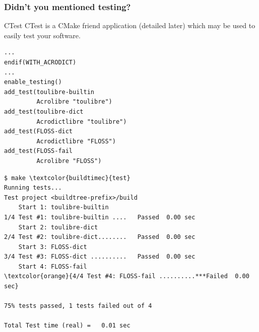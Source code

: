 \documentclass[compress,slidestop,table
              ]
               {beamer}
\begin{document}
\begin{frame}
\frametitle{Didn't you mentioned testing?}
\vspace*{-0.4cm}
\begin{block}{CTest}
CTest is a CMake friend application (detailed later) which may be used to
easily test your software.
\end{block}
\vspace*{-0.7cm}
\begin{multicols}{2}
\begin{lstlisting}[escapechar={§},basicstyle=\tiny,caption=add CTest support]
...
endif(WITH_ACRODICT)
...
enable_testing()
add_test(toulibre-builtin
         Acrolibre "toulibre")
add_test(toulibre-dict
         Acrodictlibre "toulibre")
add_test(FLOSS-dict
         Acrodictlibre "FLOSS")
add_test(FLOSS-fail
         Acrolibre "FLOSS")
\end{lstlisting}
\columnbreak
\begin{Verbatim}[commandchars=\\\{\},fontsize=\tiny]
$ make \textcolor{buildtimec}{test}
Running tests...
Test project <buildtree-prefix>/build
    Start 1: toulibre-builtin
1/4 Test #1: toulibre-builtin ....   Passed  0.00 sec
    Start 2: toulibre-dict
2/4 Test #2: toulibre-dict........   Passed  0.00 sec
    Start 3: FLOSS-dict
3/4 Test #3: FLOSS-dict ..........   Passed  0.00 sec
    Start 4: FLOSS-fail
\textcolor{orange}{4/4 Test #4: FLOSS-fail ..........***Failed  0.00 sec}

75% tests passed, 1 tests failed out of 4

Total Test time (real) =   0.01 sec


\end{Verbatim}
\end{multicols}
\end{frame}
\end{document}
